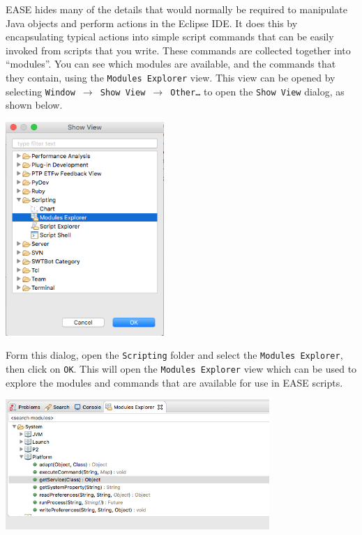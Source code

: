 EASE hides many of the details that would normally be required to manipulate
Java objects and perform actions in the Eclipse IDE. It does this by
encapsulating typical actions into simple script commands that can be easily
invoked from scripts that you write. These commands are collected together into
``modules''. You can see which modules are available, and the commands that they
contain, using the \texttt{Modules Explorer} view. This view can be opened by
selecting \texttt{Window $\rightarrow$ Show View $\rightarrow$ Other\ldots} to
open the \texttt{Show View} dialog, as shown below.

\begin{center}
\includegraphics[width=6cm]{images/showview}
\end{center}

Form this dialog, open the \texttt{Scripting} folder and select the
\texttt{Modules Explorer}, then click on \texttt{OK}. This will open the
\texttt{Modules Explorer} view which can be used to explore the modules and commands
that are available for use in EASE scripts.

\begin{center}
\includegraphics[width=10cm]{images/modulesexplorer}
\end{center}

